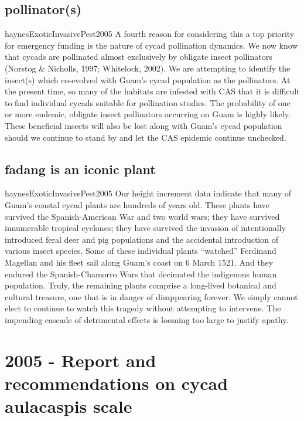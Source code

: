 \documentclass[12pt,letterpaper,english,bibliography=totocnumbered, abstract=on]{scrartcl}
\begin{document}
\begin{appendices}
\subsection{pollinator(s)}
\begin{displaycquote}{haynesExoticInvasivePest2005}
A fourth reason for considering this a top priority for emergency funding is the nature of cycad
pollination dynamics. We now know that cycads are pollinated almost exclusively by obligate insect
pollinators (Norstog \& Nicholls, 1997; Whitelock, 2002). We are attempting to identify the insect(s)
which co-evolved with Guam’s cycad population as the pollinators. At the present time, so many of
the habitats are infested with CAS that it is difficult to find individual cycads suitable for pollination
studies. The probability of one or more endemic, obligate insect pollinators occurring on Guam is
highly likely. These beneficial insects will also be lost along with Guam’s cycad population should we
continue to stand by and let the CAS epidemic continue unchecked.
\end{displaycquote}

\subsection{fadang is an iconic plant}
\begin{displaycquote}{haynesExoticInvasivePest2005}
Our height increment data indicate that many of Guam’s coastal cycad plants are hundreds of years
old. These plants have survived the Spanish-American War and two world wars; they have survived
innumerable tropical cyclones; they have survived the invasion of intentionally introduced feral deer
and pig populations and the accidental introduction of various insect species. Some of these individual
plants “watched” Ferdinand Magellan and his fleet sail along Guam’s coast on 6 March 1521. And
they endured the Spanish-Chamorro Wars that decimated the indigenous human population. Truly, the
remaining plants comprise a long-lived botanical and cultural treasure, one that is in danger of
disappearing forever. We simply cannot elect to continue to watch this tragedy without attempting to
intervene. The impending cascade of detrimental effects is looming too large to justify apathy.
\end{displaycquote}

\section{2005 - Report and recommendations on cycad aulacaspis scale}


\end{appendices}
\end{document}
